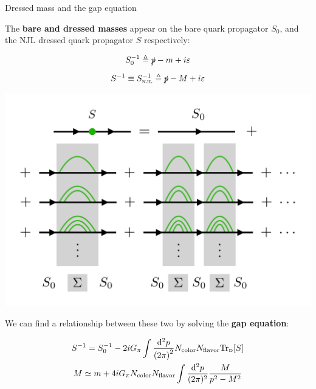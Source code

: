 \documentclass[9pt, handout, aspectratio=169]{beamer}	%
\begin{document}
\begin{frame}{Dressed mass and the gap equation}

	\begin{multicols}{2}

		The \textbf{bare and dressed masses} appear on the bare quark propagator $S_{0}$, and the NJL dressed quark propagator $S$ respectively:

		\vspace{1em}

		\begin{gather*}
		  S_0^{-1} \triangleq \slashed{p} - m + i\varepsilon \\[5pt]
		  S^{-1} \equiv S^{-1}_\text{\tiny NJL} \triangleq \slashed{p} - M + i\varepsilon
		\end{gather*}

		\columnbreak

		\begin{center}
			\includegraphics[width=.30\paperwidth]{Figures/NJL1-model-solving/gap-equation}
		\end{center}

	\end{multicols}

	We can find a relationship between these two by solving the \textbf{gap equation}:

	\begin{gather*}
		S^{-1} =
			S_{0}^{-1} - 2iG_{\pi} \int \frac{\dd[2]{p}}{\qty(2\pi)^{2}}
			N_\text{color} N_\text{flavor} \text{Tr}_\text{\tiny{D}}\qty[S] \\
	  M \simeq
	    m + 4iG_\pi N_\text{color} N_\text{flavor}
	    \int \frac{\dd[2]{p}}{(2\pi)^2} \frac{M}{p^2 - M^2}
	\end{gather*}

\end{frame}
\end{document}
